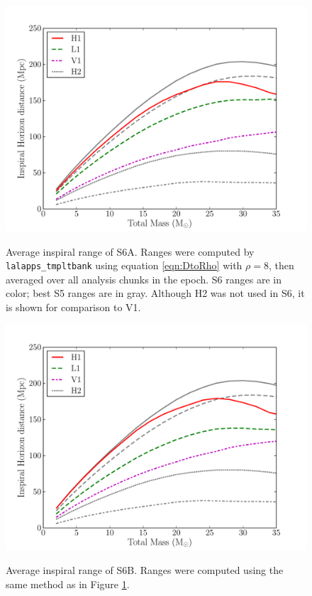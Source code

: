 \clearpage

\begin{figure}[p]
\begin{center}
\label{fig:s6a_insprange}
\includegraphics[width=6in]{figures/s6a_insprange.pdf}
\end{center}
\caption{Average inspiral range of S6A. Ranges were computed by \texttt{lalapps\_tmpltbank} using equation \ref{eqn:DtoRho} with $\rho=8$, then averaged over all analysis chunks in the epoch. S6 ranges are in color; best S5 ranges are in gray. Although H2 was not used in \ac{S6}, it is shown for comparison to V1.}
\end{figure}

\begin{figure}[p]
\begin{center}
\label{fig:s6b_insprange}
\includegraphics[width=6in]{figures/s6b_insprange.pdf}
\end{center}
\caption{Average inspiral range of S6B. Ranges were computed using the same method as in Figure \ref{fig:s6a_insprange}.}
\end{figure}


